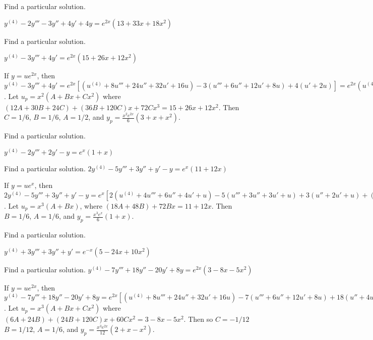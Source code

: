 \documentclass{ximera}
\begin{document}
\begin{problem}\label{exer:9.3.23}  
Find a particular solution.

$y^{(4)}-2y'''-3y''+4y'+4y=e^{2x}(13+33x+18x^2)$
\end{problem}

\begin{problem}\label{exer:9.3.24}  
Find a particular solution.

$y^{(4)}-3y'''+4y'=e^{2x}(15+26x+12x^2)$

\begin{solution}
If $y=ue^{2x}$, then
$y^{(4)}-3y'''+4y'=e^{2x}[ (u^{(4)}+8u'''+24u''+32u'+16u)
-3(u'''+6u''+12u'+8u) +4(u'+2u)] =e^{2x}(u^{(4)}+5u'''+6u'')$. Let
$u_p=x^2(A+Bx+Cx^2)$ where $(12A+30B+24C)+
(36B+120C)x+72Cx^3=15+26x+12x^2$. Then $C=1/6$, $B=1/6$, $A=1/2$, and
$y_p=\frac{x^2e^{2x}}{6}(3+x+x^2)$.
\end{solution}
\end{problem}

\begin{problem}\label{exer:9.3.25}   Find a particular solution. 

$y^{(4)}-2y'''+2y'-y=e^x(1+x)$
\end{problem}

\begin{problem}\label{exer:9.3.26}   Find a particular solution.   
$2y^{(4)}-5y'''+3y''+y'-y=e^x(11+12x)$

\begin{solution}
If $y=ue^x$, then
$2y^{(4)}-5y'''+3y''+y'-y=e^x[
2(u^{(4)}+4u'''+6u''+4u'+u) -5(u'''+3u''+3u'+u) +3(u''+2u'+u) +(u'+u)
-u]=e^x(2u^{(4)}+3u''')$.
Let $u_p=x^3(A+Bx)$, where
$(18A+48B)+72Bx=11+12x$.
Then  $B=1/6$, $A=1/6$, and
  $y_p=\frac{x^3e^x}{6}(1+x)$.
\end{solution}
\end{problem}

\begin{problem}\label{exer:9.3.27}   Find a particular solution.

$y^{(4)}+3y'''+3y''+y'=e^{-x}(5-24x+10x^2)$
\end{problem}

\begin{problem}\label{exer:9.3.28}   Find a particular solution.   $y^{(4)}-7y'''+18y''-20y'+8y=e^{2x}(3-8x-5x^2)$

\begin{solution}
If $y=ue^{2x}$, then
$y^{(4)}-7y'''+18y''-20y'+8y=e^{2x}[
(u^{(4)}+8u'''+24u''+32u'+16u) -7(u'''+6u''+12u'+8u) +18(u''+4u'+4u)
-20(u'+2u) +8u]
=e^{2x}(u^{(4)}+u''')$.
Let $u_p=x^3(A+Bx+Cx^2)$ where
$(6A+24B) +(24B+120C)x+ 60Cx^2=3-8x-5x^2$. Then
  so $C=-1/12$  $B=1/12$, $A=1/6$, and
  $y_p=\frac{x^3e^{2x}}{12}(2+x-x^2)$.
\end{solution}
\end{problem}
\end{document}
